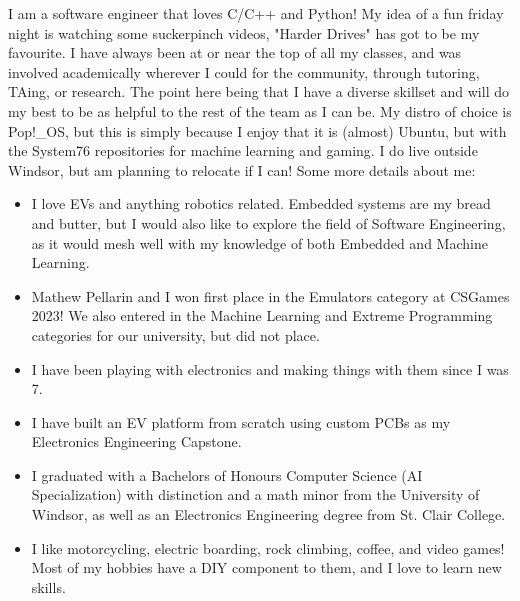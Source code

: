 I am a software engineer that loves C/C++ and Python! My idea of a fun friday night is watching some suckerpinch videos, "Harder Drives" has got to be my favourite. I have always been at or near the top of all my classes, and was involved academically wherever I could for the community, through tutoring, TAing, or research. The point here being that I have a diverse skillset and will do my best to be as helpful to the rest of the team as I can be. My distro of choice is Pop!\_OS, but this is simply because I enjoy that it is (almost) Ubuntu, but with the System76 repositories for machine learning and gaming. I do live outside Windsor, but am planning to relocate if I can! Some more details about me:

\begin{itemize}
  \item I love EVs and anything robotics related. Embedded systems are my bread and butter, but I would also like to explore the field of Software Engineering, as it would mesh well with my knowledge of both Embedded and Machine Learning.
  \item Mathew Pellarin and I won first place in the Emulators category at CSGames 2023! We also entered in the Machine Learning and Extreme Programming categories for our university, but did not place.
  \item I have been playing with electronics and making things with them since I was 7.
  \item I have built an EV platform from scratch using custom PCBs as my Electronics Engineering Capstone.
  \item I graduated with a Bachelors of Honours Computer Science (AI Specialization) with distinction and a math minor from the University of Windsor, as well as an Electronics Engineering degree from St. Clair College.
  \item I like motorcycling, electric boarding, rock climbing, coffee, and video games! Most of my hobbies have a DIY component to them, and I love to learn new skills.
\end{itemize}
